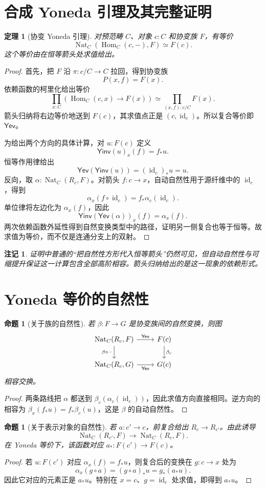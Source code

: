 \documentclass[12pt,oneside,openany,fontset=none]{ctexbook}
\theoremstyle{cn}
\newtheorem{proposition}[definition]{命题}
\newtheorem{theorem}[definition]{定理}
\newtheorem{remark}[definition]{注记}
\numberwithin{equation}{chapter}
\newcommand{\id}{\operatorname{id}}
\newcommand{\Hom}{\operatorname{Hom}}
\newcommand{\Nat}{\operatorname{Nat}}
\begin{document}
\section{合成 Yoneda 引理及其完整证明}
\begin{theorem}[协变 Yoneda 引理]\label{thm:synthetic-yoneda}
对预范畴 $C$、对象 $c:C$ 和协变族 $F$，有等价
\[
\Nat_C(\Hom_C(c,-),F)\simeq F(c).
\]
这个等价由在恒等箭头处求值给出。
\end{theorem}
\begin{proof}
首先，把 $F$ 沿 $\pi:c/C\to C$ 拉回，得到协变族
\[
P(x,f)=F(x).
\]
依赖函数的柯里化给出等价
\[
\prod_{x:C}(\Hom_C(c,x)\to F(x))
\simeq
\prod_{(x,f):c/C}F(x).
\]
箭头归纳将右边等价地送到 $F(c)$，其求值点正是 $(c,\id_c)$。所以复合等价即 $\mathsf{Yev}$。

为给出两个方向的具体计算，对 $u:F(c)$ 定义
\[
\mathsf{Yinv}(u)_x(f)=f_*u.
\]
恒等作用律给出
\[
\mathsf{Yev}(\mathsf{Yinv}(u))
=(\id_c)_*u=u.
\]
反向，取 $\alpha:\Nat_C(R_c,F)$。对箭头 $f:c\to x$，自动自然性用于源纤维中的 $\id_c$，得到
\[
\alpha_x(f\circ\id_c)=f_*\alpha_c(\id_c).
\]
单位律将左边化为 $\alpha_x(f)$，因此
\[
\mathsf{Yinv}(\mathsf{Yev}(\alpha))_x(f)=\alpha_x(f).
\]
两次依赖函数外延性得到自然变换类型中的路径，证明另一侧复合也等于恒等。故求值为等价，而不仅是连通分支上的双射。
\end{proof}
\begin{remark}
证明中普通的“把自然性方形代入恒等箭头”仍然可见，但自动自然性与可缩提升保证这一计算包含全部高阶相容。箭头归纳给出的是这一现象的依赖形式。
\end{remark}

\section{Yoneda 等价的自然性}
\begin{proposition}[关于族的自然性]
若 $\beta:F\to G$ 是协变族间的自然变换，则图
\[
\begin{tikzcd}
\Nat_C(R_c,F)\ar[r,"\mathsf{Yev}"]\ar[d,"\beta\circ-"']&F(c)\ar[d,"\beta_c"]\\
\Nat_C(R_c,G)\ar[r,"\mathsf{Yev}"']&G(c)
\end{tikzcd}
\]
相容交换。
\end{proposition}
\begin{proof}
两条路线把 $\alpha$ 都送到 $\beta_c(\alpha_c(\id_c))$，因此求值方向直接相同。逆方向的相容为
$\beta_x(f_*u)=f_*\beta_c(u)$，这是 $\beta$ 的自动自然性。
\end{proof}
\begin{proposition}[关于表示对象的自然性]
若 $a:c'\to c$，前复合给出 $R_c\to R_{c'}$。由此诱导
\[
\Nat_C(R_{c'},F)\to\Nat_C(R_c,F).
\]
在 Yoneda 等价下，该函数对应 $a_*:F(c')\to F(c)$。
\end{proposition}
\begin{proof}
若 $u:F(c')$ 对应 $\alpha_x(f)=f_*u$，则复合后的变换在 $g:c\to x$ 处为
\[
\alpha_x(g\circ a)=(g\circ a)_*u=g_*(a_*u).
\]
因此它对应的元素正是 $a_*u$。特别在 $x=c$、$g=\id_c$ 处求值，即得到 $a_*u$。
\end{proof}
\end{document}
